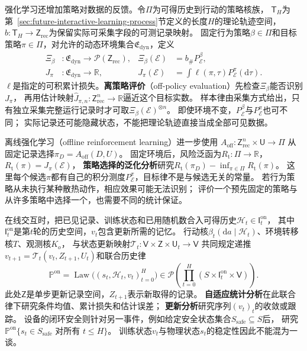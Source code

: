 强化学习还增加策略对数据的反馈。令$\Pi$为可得历史到行动的策略核族，
$\mathsf T_H$为第~\ref{sec:future-interactive-learning-process}节定义的长度$H$的理论轨迹空间，
$b:\mathsf T_H\to\mathsf Z_{\mathrm{rec}}$为保留实际可采集字段的可测记录映射。
固定行为策略$\beta\in\Pi$和目标策略$\pi\in\Pi$，对允许的动态环境集合$\mathfrak E_{\mathrm{dyn}}$，定义
\begin{equation}
  \begin{aligned}
    \Xi_\beta&:\mathfrak E_{\mathrm{dyn}}\to\mathcal P(\mathsf Z_{\mathrm{rec}}),
      &\Xi_\beta(\mathcal E)&=b_{\#}P_{\mathcal E}^{\beta},\\
    J_\pi&:\mathfrak E_{\mathrm{dyn}}\to\mathbb R,
      &J_\pi(\mathcal E)&=\int\ell(\pi,\tau)P_{\mathcal E}^{\pi}(\mathrm d\tau).
  \end{aligned}
  \label{eq:future-task-off-policy-maps}
\end{equation}
$\ell$是指定的可积累计损失。\textbf{离策略评价}（off-policy evaluation）先检查$\Xi_\beta$能否识别$J_\pi$，
再用估计映射$\widehat J_{\pi,n}:\mathsf Z_{\mathrm{rec}}^n\to\mathbb R$逼近这个目标实数。
样本律由采集方式给出，只有独立采集完整运行记录时才可取$\Xi_\beta(\mathcal E)^{\otimes n}$。
即使环境不变，$P_{\mathcal E}^{\beta}$与$P_{\mathcal E}^{\pi}$也可不同；
实际记录还可能隐藏状态，不能把理论轨迹直接当成全部可见数据。

离线强化学习（offline reinforcement learning）进一步使用
$A_{\mathrm{off}}:\mathsf Z_{\mathrm{rec}}^n\times\mathsf U\to\Pi$
从固定记录选择$\pi_D=A_{\mathrm{off}}(D,U)$。
固定环境后，风险泛函为$R_{\mathrm t}:\Pi\to\mathbb R$，$R_{\mathrm t}(\pi)=J_\pi(\mathcal E)$，
\textbf{策略选择的泛化分析}研究$R_{\mathrm t}(\pi_D)-\inf_{\pi\in\Pi}R_{\mathrm t}(\pi)$。
这里每个候选$\pi$都有自己的积分测度$P_{\mathcal E}^{\pi}$，目标律不是与候选无关的常量。
若行为策略从未执行某种散热动作，相应效果可能无法识别；
评价一个预先固定的策略与从许多策略中选择一个，也需要不同的统计保证。

在线交互时，把已见记录、训练状态和已用随机数合入可得历史$\mathscr H_t\in\mathsf I_t^{\mathrm{on}}$，
其中$\mathsf I_t^{\mathrm{on}}$是第$t$轮的历史空间，$v_t$包含更新所需的记忆。
行动核$\beta_t(\mathrm da\mid\mathscr H_t)$、环境转移核$T$、观测核$K_o$，
与状态更新映射$\mathcal T_t:\mathsf V\times\mathsf Z\times\mathsf U_t\to\mathsf V$
共同规定递推$v_{t+1}=\mathcal T_t(v_t,Z_{t+1},U_t)$和联合历史律
\[
  \mathbb P^{\mathrm{on}}
  =\operatorname{Law}\bigl((s_t,\mathscr H_t,v_t)_{t=0}^H\bigr)
  \in\mathcal P\!\left(\prod_{t=0}^H(S\times\mathsf I_t^{\mathrm{on}}\times\mathsf V)\right).
\]
此处$\mathsf Z$是单步更新记录空间，$Z_{t+1}$表示新取得的记录。
\textbf{自适应统计分析}在此联合律下研究条件均值、累计损失和估计误差；
\textbf{更新分析}研究序列$(v_t)_t$的收敛或跟踪。
设备的闭环安全则针对另一事件，例如给定安全状态集合$S_{\mathrm{safe}}\subseteq S$后，
研究$\mathbb P^{\mathrm{on}}\{s_t\in S_{\mathrm{safe}}\text{ 对所有 }t\leq H\}$。
训练状态$v_t$与物理状态$s_t$的稳定性因此不能混为一谈。

